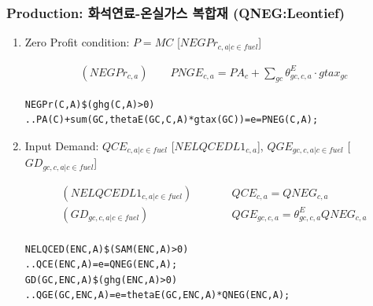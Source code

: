 \documentclass[10pt,compress,slidetop,%
			   hyperref={unicode},xcolor={svgnames},%
			   t]{beamer}
\begin{document}
\begin{frame}[fragile]
\frametitle{Production: 화석연료-온실가스 복합재 (QNEG:Leontief)}


\begin{scriptsize}
\begin{enumerate}
\item{Zero Profit condition: $P=MC$ [$NEGPr_{c,a|c\in fuel}$]}

\begin{eqnarray*}
(NEGPr_{c,a})\qquad PNGE_{c,a}=PA_c +\sum_{gc}\theta^E_{gc,c,a}\cdot gtax_{gc}
\end{eqnarray*}

\begin{verbatim}
NEGPr(C,A)$(ghg(C,A)>0)
..PA(C)+sum(GC,thetaE(GC,C,A)*gtax(GC))=e=PNEG(C,A);
\end{verbatim}

\item{Input Demand: $QCE_{c,a|c \in fuel}$ [$NELQCEDL1_{c,a}$], $QGE_{gc,c,a|c\in fuel}$ [$GD_{gc,c,a|c \in fuel}$]}

\begin{eqnarray*}
(NELQCEDL1_{c,a|c \in fuel})&\qquad& QCE_{c,a}=QNEG_{c,a}\\
(GD_{gc,c,a|c \in fuel})&\qquad& QGE_{gc,c,a}=\theta^E_{gc,c,a}QNEG_{c,a}\\
\end{eqnarray*}

\begin{verbatim}
NELQCED(ENC,A)$(SAM(ENC,A)>0)
..QCE(ENC,A)=e=QNEG(ENC,A);
GD(GC,ENC,A)$(ghg(ENC,A)>0)
..QGE(GC,ENC,A)=e=thetaE(GC,ENC,A)*QNEG(ENC,A);
\end{verbatim}

\end{enumerate}
\end{scriptsize}
\end{frame}
\end{document}
